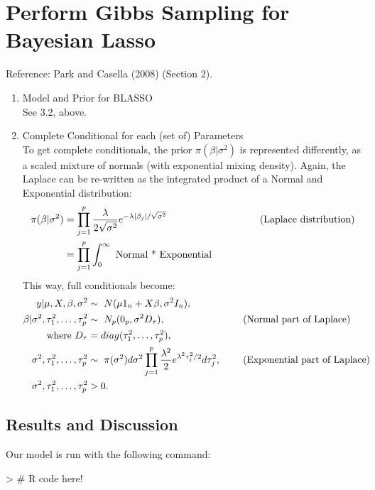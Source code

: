 \documentclass[11pt,letterpaper]{article}
\begin{document}
\section{Perform Gibbs Sampling for Bayesian Lasso}
  Reference: Park and Casella (2008) (Section 2).
  \begin{enumerate}
      \item Model and Prior for BLASSO\\
      See 3.2, above.
      \item Complete Conditional for each (set of) Parameters\\
      To get complete conditionals, the prior $\pi(\beta|\sigma^2)$ is represented
      differently, as a scaled mixture of normals (with exponential mixing density).
      Again, the Laplace can be re-written as the integrated product of a Normal and
      Exponential distribution:\\
          \begin{align*}
          \pi(\beta|\sigma^2)&=\prod\limits_{j=1}^p \frac{\lambda}{2\sqrt{\sigma^2}}e^{
          -\lambda|\beta_j|/\sqrt{\sigma^2}} \hspace{33mm}\text{(Laplace distribution)}\\
          &=\prod\limits_{j=1}^p \int_{0}^{\infty} \text{ Normal * Exponential}
          \end{align*}
      This way, full conditionals become:\\
          \begin{align*}
          y|\mu,X,\beta,\sigma^2 &\sim\ N(\mu1_n+X\beta,\sigma^2I_n),\\
          \beta|\sigma^2,\tau_1^2,\ldots,\tau_p^2 &\sim\ N_p(0_p,\sigma^2D_\tau),
            &&\hspace{5mm}\text{(Normal part of Laplace)}\\
          \text{ where }D_\tau &= diag(\tau_1^2,\ldots,\tau_p^2),\\
          \sigma^2,\tau_1^2,\ldots,\tau_p^2 &\sim\ \pi(\sigma^2)d\sigma^2 \prod_{j=1}^p
            \frac{\lambda^2}{2}e^{\lambda^2\tau_j^2/2}d\tau_j^2,
            &&\hspace{5mm}\text{(Exponential part of Laplace)}\\
          \sigma^2,\tau_1^2,\ldots,\tau_p^2 &> 0.
          \end{align*}
      
  \end{enumerate}












\newpage



\subsection*{Results and Discussion}
Our model is run with the following command:
\begin{Schunk}
\begin{Sinput}
> # R code here!
\end{Sinput}
\end{Schunk}
\end{document}
